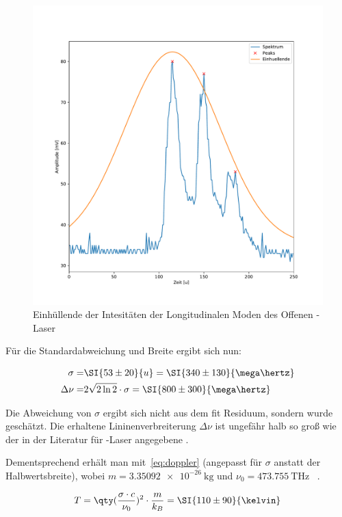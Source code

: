 \documentclass[slug=GL, room=HZDR\ Dresden/Rossendorf\,\ Geb.\ 620/123, supervisor=Tim\ Ziegler]{../../Lab_Report_LaTeX/lab_report}
\newcommand{\hne}{\ce{HeNe}-Laser}
\begin{document}
\begin{figure}[b]\centering
  \includegraphics[width=.8\columnwidth]{figs/verbr_fit.pdf}

  \caption{Einh\"ullende der Intesit\"aten der Longitudinalen Moden
    des Offenen \hne{}}
  \label{fig:fit_einh}
\end{figure}

F\"ur die Standardabweichung und Breite ergibt sich nun:

\begin{align}
  \sigma =& \SI{53\pm 20}{u} = \SI{340\pm 130}{\mega\hertz} \\
  \Delta\nu =& 2\sqrt{2\ln{2}}\cdot\sigma = \SI{800\pm 300}{\mega\hertz}
\end{align}

Die Abweichung von \(\sigma\) ergibt sich nicht aus dem fit Residuum,
sondern wurde gesch\"atzt. Die erhaltene Lininenverbreiterung
\(\Delta\nu\) ist ungef\"ahr halb so gro\ss{} wie der in der
Literatur f\"ur \hne{} angegebene .

Dementsprechend erh\"alt man mit~\ref{eq:doppler} (angepasst f\"ur
\(\sigma\) anstatt der Halbwertsbreite), wobei
\(m=\SI{3.35092e-26}{\kg}\) und \(\nu_0=\SI{473.755}{\tera\hertz}\)
~\autocite{IUPAC2013}.

\begin{align}
  \label{eq:temp}
  T = \qty(\frac{\sigma\cdot c}{\nu_0})^2\cdot \frac{m}{k_B}=\SI{110\pm 90}{\kelvin}
\end{align}
\end{document}
